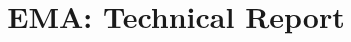 \documentclass[sigconf,nonacm]{acmart}
\begin{document}
\title{EMA: Technical Report}






\renewcommand{\shortauthors}{Anonymous.}




\end{document}
